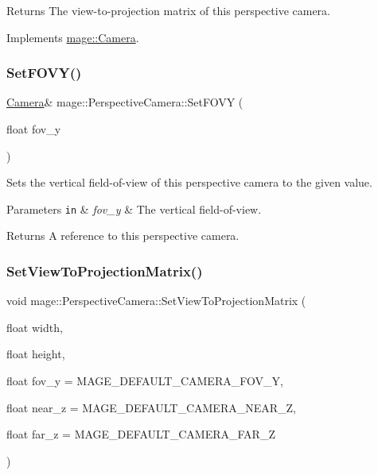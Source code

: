 \begin{DoxyReturn}{Returns}
The view-\/to-\/projection matrix of this perspective camera. 
\end{DoxyReturn}


Implements \hyperlink{classmage_1_1_camera_a1f5206864cf18b5548219492556df5d2}{mage\+::\+Camera}.

\hypertarget{classmage_1_1_perspective_camera_a00033fc6b25206c40a056ce142fecfee}{}\label{classmage_1_1_perspective_camera_a00033fc6b25206c40a056ce142fecfee} 
\subsubsection{\texorpdfstring{Set\+F\+O\+V\+Y()}{SetFOVY()}}
{\footnotesize\ttfamily \hyperlink{classmage_1_1_camera}{Camera}\& mage\+::\+Perspective\+Camera\+::\+Set\+F\+O\+VY (\begin{DoxyParamCaption}\item[{float}]{fov\+\_\+y }\end{DoxyParamCaption})}

Sets the vertical field-\/of-\/view of this perspective camera to the given value.


\begin{DoxyParams}[1]{Parameters}
\mbox{\tt in}  & {\em fov\+\_\+y} & The vertical field-\/of-\/view. \\
\hline
\end{DoxyParams}
\begin{DoxyReturn}{Returns}
A reference to this perspective camera. 
\end{DoxyReturn}
\hypertarget{classmage_1_1_perspective_camera_adef65223ab45c65cebf712dd14cea942}{}\label{classmage_1_1_perspective_camera_adef65223ab45c65cebf712dd14cea942} 
\subsubsection{\texorpdfstring{Set\+View\+To\+Projection\+Matrix()}{SetViewToProjectionMatrix()}}
{\footnotesize\ttfamily void mage\+::\+Perspective\+Camera\+::\+Set\+View\+To\+Projection\+Matrix (\begin{DoxyParamCaption}\item[{float}]{width,  }\item[{float}]{height,  }\item[{float}]{fov\+\_\+y = {\ttfamily MAGE\+\_\+DEFAULT\+\_\+CAMERA\+\_\+FOV\+\_\+Y},  }\item[{float}]{near\+\_\+z = {\ttfamily MAGE\+\_\+DEFAULT\+\_\+CAMERA\+\_\+NEAR\+\_\+Z},  }\item[{float}]{far\+\_\+z = {\ttfamily MAGE\+\_\+DEFAULT\+\_\+CAMERA\+\_\+FAR\+\_\+Z} }\end{DoxyParamCaption})}

